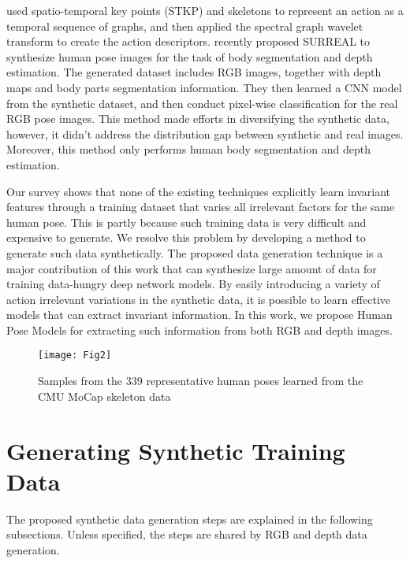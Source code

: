 \documentclass[twocolumn]{svjour3}          \smartqed  \usepackage{graphicx}
\begin{document}
\citet{kerola2017cross} used spatio-temporal key points (STKP) and skeletons to represent an action as a temporal sequence of graphs, and then applied the spectral graph wavelet transform to create the action descriptors. \citet{varol17} recently proposed SURREAL to synthesize human pose images for the task of body segmentation and depth estimation. The generated dataset includes RGB images, together with depth maps and body parts segmentation information. They then learned a CNN model from the synthetic dataset, and then conduct pixel-wise classification for the real RGB pose images. This method made efforts in diversifying the synthetic data, however, it didn't address the distribution gap between synthetic and real images. Moreover, this method only performs human body segmentation and depth estimation.

Our survey shows that none of the existing techniques explicitly learn invariant features through a training dataset that varies all irrelevant factors for the same human pose. This is partly because such training data is very difficult and expensive to generate. We resolve  this problem by developing a method to generate such data synthetically.  The proposed data generation technique is a major contribution of this work that can  synthesize large amount of data for training data-hungry deep  network models. By easily introducing a variety of action irrelevant  variations in the synthetic data, it is possible to learn effective models that can extract invariant information. In this work, we propose Human Pose Models for extracting such information from both RGB and depth images.


\begin{figure}[t]
\centering
\texttt{[image: Fig2]}
\caption{Samples from the 339 representative human poses learned from the CMU MoCap skeleton data}
\label{fig:pose_dictionary}
\vspace{-3mm}
\end{figure}


\vspace{-2mm}
\section{Generating Synthetic Training Data}
\label{sec:data}
The proposed synthetic data generation steps are explained in the following subsections. Unless specified, the steps are shared by RGB and depth data generation.

\vspace{-2mm}
\end{document}
